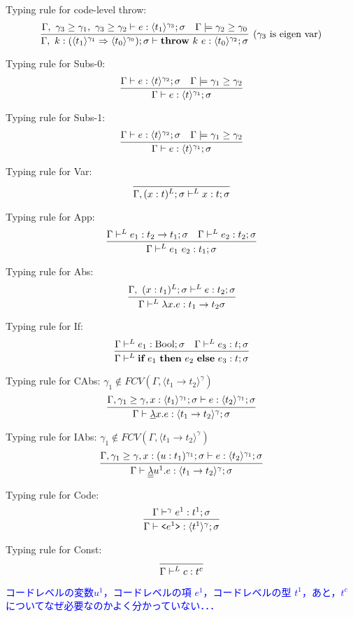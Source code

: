 \documentclass[10pt,a4j]{jarticle}
\newcommand\blue[1]{\textcolor{blue}{#1}}
\newcommand\fun[2]{\lambda{#1}.{#2}}
\newcommand\Throw{\textbf{throw}}
\newcommand\throw[2]{\Throw~{#1}~{#2}}
\newcommand\cfun[2]{\underline{\lambda}{#1}.{#2}}
\newcommand\ccfun[2]{\underline{\underline{\lambda}}{#1}.{#2}}
\newcommand\code[1]{\texttt{<}{#1}\texttt{>}}
\newcommand\codeT[2]{\langle{#1}\rangle^{#2}}
\newcommand\contT[2]{({#1} \Rightarrow {#2})}
\newcommand\ord{\ge}
\newcommand\ift[3]{\textbf{if}~{#1}~\textbf{then}~{#2}~\textbf{else}~{#3}}
\newcommand\ooi[1]{\blue{{#1}}}
\theoremstyle{break}
\begin{document}
Typing rule for code-level throw:
\[
  \infer[(\gamma_3~\text{is eigen var})]
  {\Gamma,~k:\contT{\codeT{t_1}{\gamma_1}}{\codeT{t_0}{\gamma_0}} ; \sigma
    \vdash \throw{k}{e} : \codeT{t_0}{\gamma_2} ; \sigma}
  {\Gamma,~
    \gamma_3 \ord \gamma_1,~
    \gamma_3 \ord \gamma_2
    \vdash e : \codeT{t_1}{\gamma_3} ; \sigma
    & \Gamma \models \gamma_2 \ord \gamma_0
  }
\]

Typing rule for Subs-0:
\[
  \infer
  {\Gamma \vdash e : \codeT{t}{\gamma_1} ; \sigma}
  {\Gamma \vdash e : \codeT{t}{\gamma_2} ; \sigma
    & \Gamma \models \gamma_1 \ord \gamma_2
  }
\]

Typing rule for Subs-1:
\[
  \infer
  {\Gamma \vdash e : \codeT{t}{\gamma_1} ; \sigma}
  {\Gamma \vdash e : \codeT{t}{\gamma_2} ; \sigma
    & \Gamma \models \gamma_1 \ord \gamma_2
  }
\]

Typing rule for Var:
\[
  \infer
  {\Gamma, (x : t)^{L} ; \sigma \vdash^{L} x : t ; \sigma}
  {}
\]

Typing rule for App:
\[
  \infer
  {\Gamma \vdash^{L} e_1~ e_2 : t_1 ; \sigma}
  {\Gamma \vdash^{L} e_1 : t_2 \to t_1 ; \sigma
    & \Gamma \vdash^{L} e_2 : t_2  ; \sigma
  }
\]

Typing rule for Abs:
\[
  \infer
  {\Gamma \vdash^{L} \fun{x}{e} : t_1 \to t_2 \sigma}
  {\Gamma,~(x : t_1)^{L} ; \sigma \vdash^{L} e : t_2 ; \sigma}
\]

Typing rule for If:
\[
  \infer
  {\Gamma \vdash^{L} \ift{e_1}{e_2}{e_3} : t ; \sigma}
  {\Gamma \vdash^{L} e_1 : \textrm{Bool} ; \sigma
    & \Gamma \vdash^{L} e_3 : t ; \sigma}
\]

Typing rule for CAbs: $\gamma_1 \not \in FCV(\Gamma, \codeT{t_1 \to t_2}{\gamma})$
\[
  \infer
  {\Gamma \vdash \cfun{x}{e} : \codeT{t_1 \to t_2}{\gamma} ; \sigma}
  {\Gamma, \gamma_1 \ord \gamma, x : \codeT{t_1}{\gamma_1} ; \sigma \vdash e : \codeT{t_2}{\gamma_1} ; \sigma}
\]

Typing rule for IAbs: $\gamma_1 \not \in FCV(\Gamma, \codeT{t_1 \to t_2}{\gamma})$
\[
  \infer
  {\Gamma \vdash \ccfun{u^1}{e} : \codeT{t_1 \to t_2}{\gamma} ; \sigma}
  {\Gamma, \gamma_1 \ord \gamma, x : (u : t_1)^{\gamma_1} ; \sigma \vdash e : \codeT{t_2}{\gamma_1} ; \sigma}
\]

Typing rule for Code:
\[
  \infer
  {\Gamma \vdash \code{e^1} : \codeT{t^1}{\gamma} ; \sigma}
  {\Gamma \vdash^{\gamma} e^1 : t^1 ; \sigma}
\]

Typing rule for Const:
\[
  \infer
  {\Gamma \vdash^{L} c : t^c}
  {}
\]


\ooi{コードレベルの変数$u^1$，コードレベルの項 $e^1$，コードレベルの型 $t^1$，あと，$t^c$  についてなぜ必要なのかよく分かっていない．．．}
\end{document}
